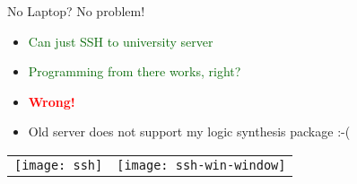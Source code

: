 \begin{frame}[t]{}
	\Huge No Laptop? No problem!
	\normalsize
	\begin{itemize}
		\item \textcolor{darkgreen}{Can just SSH to university server}
		\item \textcolor{darkgreen}{Programming from there works, right?}
		\item<2> \textbf{\textcolor{red}{Wrong!}}
		\item<2> Old server does not support my logic synthesis package :-(
	\end{itemize}
	\vspace{1em}
	\begin{tabular}{rl}
		\texttt{[image: ssh]}
		&
		\texttt{[image: ssh-win-window]}
	\end{tabular}

\end{frame}

